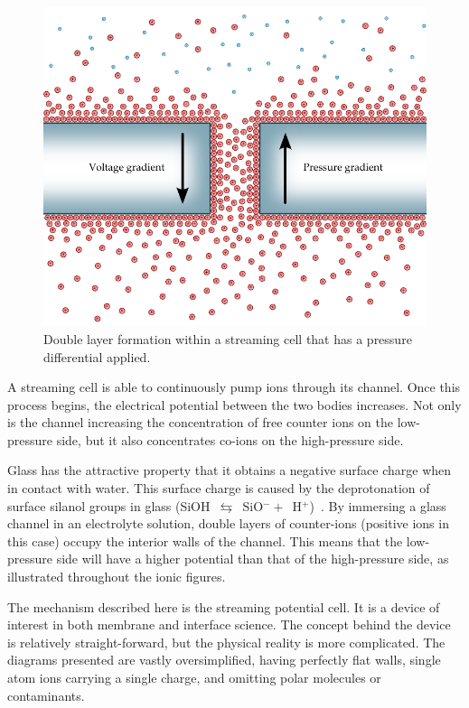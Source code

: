     \begin{figure}[ht]
        \centering
        \includegraphics{content/pt1/01-PowerHarvesting/graphics/intro_2_channel}
        \caption{\label{fig:doubleLayerInChannel_withPressure}Double layer formation within a streaming cell that has a pressure differential applied.}
    \end{figure}

    A streaming cell is able to continuously pump ions through its channel.
    Once this process begins, the electrical potential between the two bodies increases.
    Not only is the channel increasing the concentration of free counter ions on the low-pressure side, but it also concentrates co-ions on the high-pressure side.

    Glass has the attractive property that it obtains a negative surface charge when in contact with water.
    This surface charge is caused by the deprotonation of surface silanol groups in glass (SiOH~$\leftrightarrows$~SiO$^{-}+$~H$^{+}$)~\cite{Kirby2004a}.
    By immersing a glass channel in an electrolyte solution, double layers of counter-ions (positive ions in this case) occupy the interior walls of the channel.
    This means that the low-pressure side will have a higher potential than that of the high-pressure side, as illustrated throughout the ionic figures.

    The mechanism described here is the streaming potential cell.
    It is a device of interest in both membrane and interface science.
    The concept behind the device is relatively straight-forward, but the physical reality is more complicated.
    The diagrams presented are vastly oversimplified, having perfectly flat walls, single atom ions carrying a single charge, and omitting polar molecules or contaminants.

